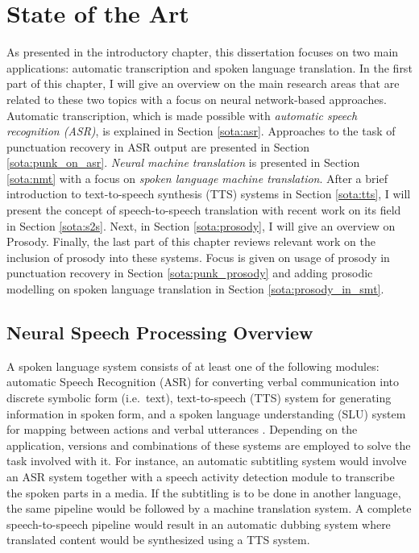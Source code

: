 
\chapter{State of the Art}
\label{chapter:sota}
As presented in the introductory chapter, this dissertation focuses on two main applications: automatic transcription and spoken language translation. In the first part of this chapter, I will give an overview on the main research areas that are related to these two topics with a focus on neural network-based approaches. Automatic transcription, which is made possible with \textit{automatic speech recognition (ASR)}, is explained in Section \ref{sota:asr}. Approaches to the task of punctuation recovery in ASR output are presented in Section \ref{sota:punk_on_asr}. \textit{Neural machine translation} is presented in Section \ref{sota:nmt} with a focus on \textit{spoken language machine translation}. After a brief introduction to text-to-speech synthesis (TTS) systems in Section \ref{sota:tts}, I will present the concept of speech-to-speech translation with recent work on its field in Section \ref{sota:s2s}. Next, in Section \ref{sota:prosody}, I will give an overview on Prosody. Finally, the last part of this chapter reviews relevant work on the inclusion of prosody into these systems. Focus is given on usage of prosody in punctuation recovery in Section \ref{sota:punk_prosody} and adding prosodic modelling on spoken language translation in Section \ref{sota:prosody_in_smt}. 


\section{Neural Speech Processing Overview}
\label{sota:neuralspeech}

A spoken language system consists of at least one of the following modules: automatic Speech Recognition (ASR) for converting verbal communication into discrete symbolic form (i.e.~text), text-to-speech (TTS) system for generating information in spoken form, and a spoken language understanding (SLU) system for mapping between actions and verbal utterances \citep{slp_book}. Depending on the application, versions and combinations of these systems are employed to solve the task involved with it. For instance, an automatic subtitling system would involve an ASR system together with a speech activity detection module to transcribe the spoken parts in a media. If the subtitling is to be done in another language, the same pipeline would be followed by a machine translation system. A complete speech-to-speech pipeline would result in an automatic dubbing system where translated content would be synthesized using a TTS system. 

